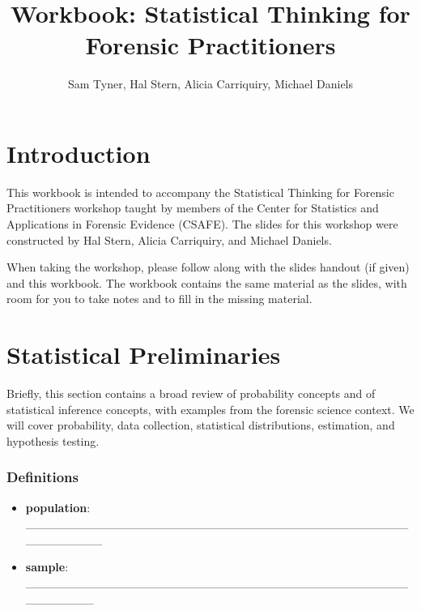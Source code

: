 \documentclass[]{book}
\title{Workbook: Statistical Thinking for Forensic Practitioners}
\author{Sam Tyner, Hal Stern, Alicia Carriquiry, Michael Daniels}
\date{}
\providecommand{\tightlist}{%
  \setlength{\itemsep}{0pt}\setlength{\parskip}{0pt}}
\theoremstyle{definition}
\theoremstyle{definition}
\theoremstyle{remark}
\begin{document}
\maketitle

{
\setcounter{tocdepth}{1}
\tableofcontents
}
\chapter{Introduction}\label{introduction}

This workbook is intended to accompany the Statistical Thinking for
Forensic Practitioners workshop taught by members of the Center for
Statistics and Applications in Forensic Evidence (CSAFE). The slides for
this workshop were constructed by Hal Stern, Alicia Carriquiry, and
Michael Daniels.

When taking the workshop, please follow along with the slides handout
(if given) and this workbook. The workbook contains the same material as
the slides, with room for you to take notes and to fill in the missing
material.

\chapter{Statistical Preliminaries}\label{statistical-preliminaries}

Briefly, this section contains a broad review of probability concepts
and of statistical inference concepts, with examples from the forensic
science context. We will cover probability, data collection, statistical
distributions, estimation, and hypothesis testing. \vspace{-.25in}

\subsection{Definitions}\label{definitions}

\begin{itemize}
\tightlist
\item
  \textbf{population}:
  \_\_\_\_\_\_\_\_\_\_\_\_\_\_\_\_\_\_\_\_\_\_\_\_\_\_\_\_\_\_\_\_\_\_\_\_\_\_\_\_\_\_\_\_\_\_\_\_\_\_\_\_\_\_
\end{itemize}

\vspace{.1in}

\begin{itemize}
\tightlist
\item
  \textbf{sample}:
  \_\_\_\_\_\_\_\_\_\_\_\_\_\_\_\_\_\_\_\_\_\_\_\_\_\_\_\_\_\_\_\_\_\_\_\_\_\_\_\_\_\_\_\_\_\_\_\_\_\_\_\_\_
\end{itemize}
\end{document}
